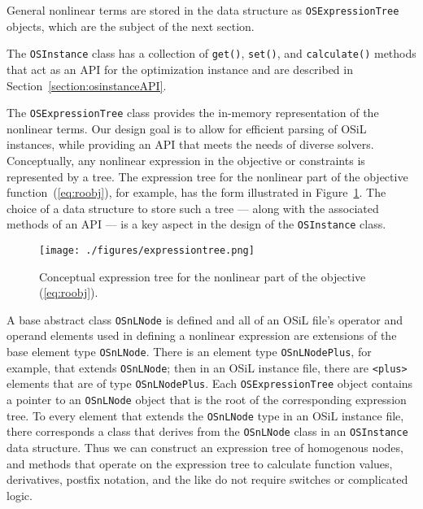 %
General nonlinear terms are stored in the data structure as {\tt OSExpressionTree} objects, which are the subject of the next section.

     The {\tt OSInstance} class has a collection of {\tt get()}, {\tt set()}, and {\tt calculate()} methods 
that act as an API for the optimization instance and are described in Section~\ref{section:osinstanceAPI}.




\label{section:osexpressiontreeclass}

The {\tt OSExpressionTree} class provides the in-memory representation
of the nonlinear terms.  Our design goal is  to allow for efficient parsing of OSiL instances,
while providing an API that meets the needs of diverse solvers.  Conceptually, any nonlinear expression in the
objective or constraints is represented by a tree.  The expression tree for the nonlinear part of the
objective function~(\ref{eq:roobj}), for example, has the form illustrated in Figure~\ref{figure:expressiontree}.
The choice of a data structure to store such a tree --- along with the associated methods of an API --- is a key aspect
in the design of the {\tt OSInstance} class.

\begin{figure}[ht]
\centering
\texttt{[image: ./figures/expressiontree.png]}
\caption{Conceptual expression tree for the nonlinear part of the objective (\ref{eq:roobj}).}\label{figure:expressiontree}
\end{figure}


A base abstract class {\tt OSnLNode} is defined and  all of an OSiL file's
operator and operand elements used in defining a
nonlinear expression are extensions of the base element type {\tt OSnLNode}. There is an element type {\tt OSnLNodePlus}, 
for example, that extends {\tt OSnLNode}; then in an OSiL instance file, there are {\tt <plus>} elements that 
are of type {\tt OSnLNodePlus}.   Each {\tt OSExpressionTree} object contains a pointer to an {\tt OSnLNode} object 
that is the root of the corresponding expression tree.  To every element that extends the {\tt OSnLNode} type in an 
OSiL instance file, there corresponds a class that derives from the {\tt OSnLNode} class in an {\tt OSInstance} 
data structure.  Thus we can construct an expression tree of homogenous nodes, and methods that operate on the 
expression tree to calculate function values, derivatives, postfix notation, and the like do not require switches 
or complicated logic.



